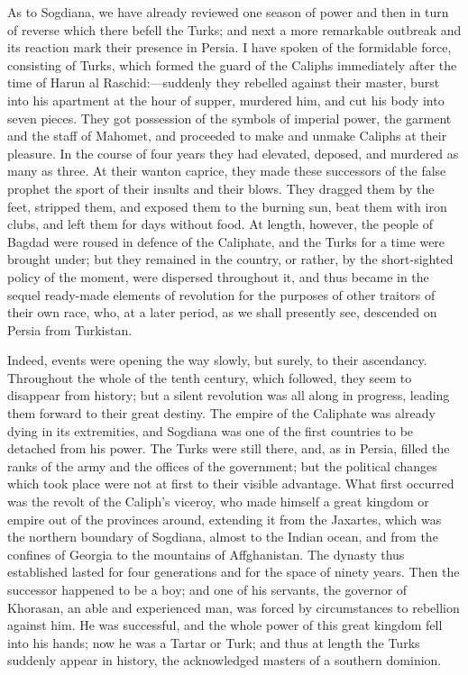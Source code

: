 As to Sogdiana, we have
already reviewed one season of power and then in turn of reverse which
there befell the Turks; and next a more remarkable outbreak and its
reaction mark their presence in Persia. I have spoken of the
formidable force, consisting of Turks, which formed the guard of the
Caliphs immediately after the time of Harun al Raschid:—suddenly
they rebelled against their master, burst into his apartment at the
hour of supper, murdered him, and cut his body into seven pieces. They
got possession of the symbols of imperial power, the garment and the
staff of Mahomet, and proceeded to make and unmake Caliphs at their
pleasure. In the course of four years they had elevated, deposed, and
murdered as many as three. At their wanton caprice, they made these
successors of the false prophet the sport of their insults and their
blows. They dragged them by the feet, stripped them, and exposed them
to the burning sun, beat them with iron clubs, and left them for days
without food. At length, however, the people of Bagdad were roused in
defence of the Caliphate, and the Turks for a time were brought under;
but they remained in the country, or rather, by the short-sighted
policy of the moment, were dispersed throughout it, and thus became in
the sequel ready-made elements of revolution for the purposes of other
traitors of their own race, who, at a later period, as we shall
presently see, descended on Persia from Turkistan.

Indeed, events were opening
the way slowly, but surely, to their ascendancy. Throughout the whole
of the tenth century, which followed, they seem to disappear from
history; but a silent revolution was all along in progress, leading
them forward to their great destiny. The empire of the Caliphate was
already dying in its extremities, and Sogdiana was one of the first
countries to be detached from his power. The Turks were still there,
and, as in Persia, filled the ranks of the army and the offices of the
government; but the political changes which took place were not at
first to their visible advantage. What first occurred was the revolt
of the Caliph's viceroy, who made himself a great kingdom or
empire out of the provinces around, extending it from the Jaxartes,
which was the northern boundary of Sogdiana, almost to the Indian
ocean, and from the confines of Georgia to the mountains of
Affghanistan. The dynasty thus established lasted for four generations
and for the space of ninety years. Then the successor happened to be a
boy; and one of his servants, the governor of Khorasan, an able and
experienced man, was forced by circumstances to rebellion against him.
He was successful, and the whole power of this great kingdom fell into
his hands; now he was a Tartar or Turk; and thus at length the Turks
suddenly appear in history, the acknowledged masters of a southern
dominion.


